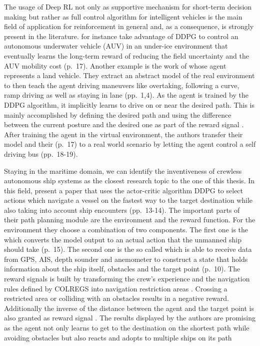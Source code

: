 \par
The usage of Deep RL not only as supportive mechanism for short-term decision making but rather as full control algorithm for intelligent vehicles is the main field of application for reinforcement in general and, 
as a consequence, is strongly present in the literature. \cite{wang2018reinforcement} for instance take advantage of DDPG to control an autonomous underwater vehicle (AUV) in an under-ice environment that eventually learns the long-term reward of reducing the field uncertainty and the AUV mobility cost (p.~17). Another example is the work of \cite{s18092905} whose agent represents a land vehicle. They extract an abstract model of the real environment to then teach the agent driving maneuvers like overtaking, following a curve, ramp driving as well as staying in lane (pp.~1,4). As the agent is trained by the DDPG algorithm, it implicitly learns to drive on or near the desired path. This is mainly accomplished by defining the desired path and using the difference between the current posture and the desired one as part of the reward signal \cite[p.~4]{s18092905}. After training the agent in the virtual environment, the authors transfer their model and their  (p.~17) to a real world scenario by letting the agent control a self driving bus (pp.~18-19).
\par
Staying in the maritime domain, we can identify the inventiveness of crewless autonomous ship systems as the closest research topic to the one of this thesis. In this field, \cite{s20020426} present a paper that uses the actor-critic algorithm DDPG to select actions which navigate a vessel on the fastest way to the target destination while also taking into account ship encounters (pp.~13-14). The important parts of their path planning module are the environment and the reward function. For the environment they choose a combination of two components. The first one is the  which converts the model output to an actual action that the unmanned ship should take (p.~15). The second one is the so called  which is able to receive data from GPS, AIS, depth sounder and anemometer to construct a state that holds information about the ship itself, obstacles and the target point (p.~10). The reward signals is built by transforming the crew's experience and the navigation rules defined by COLREGS \cite[]{COLREG} into navigation restriction areas \cite[p.~14]{s20020426}. Crossing a restricted area or colliding with an obstacles results in a negative reward. Additionally the inverse of the distance between the agent and the target point is also granted as reward signal \cite[p.~14]{s20020426}. The results displayed by the authors are promising as the agent not only learns to get to the destination on the shortest path while avoiding obstacles but also reacts and adopts to multiple ships on its path
